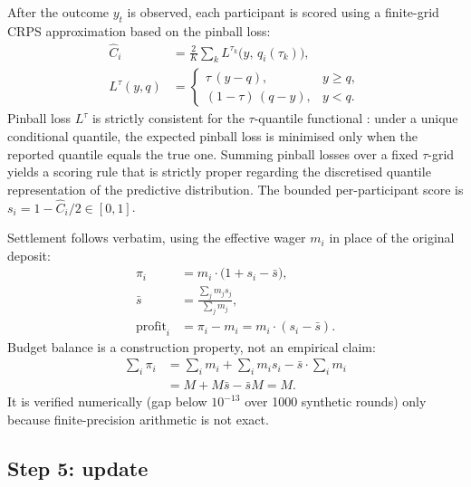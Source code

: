 \documentclass[
  11pt,
  a4paper,
  oneside]{report}
\begin{document}
After the outcome \(y_t\) is observed, each participant is scored using
a finite-grid CRPS approximation based on the pinball loss:
\begin{align}
  \hat{C}_i &= \frac{2}{K} \sum_k L^{\tau_k}\!\big(y,\, q_i(\tau_k)\big), \\
  L^{\tau}(y, q) &=
  \begin{cases}
    \tau\, (y - q), & y \geq q, \\
    (1 - \tau)\, (q - y), & y < q.
  \end{cases}
\end{align} Pinball loss \(L^{\tau}\) is strictly consistent for the
\(\tau\)-quantile functional
\citep{gneiting2007strictly, steinwart2011estimating}: under a unique
conditional quantile, the expected pinball loss is minimised only when
the reported quantile equals the true one. Summing pinball losses over a
fixed \(\tau\)-grid yields a scoring rule that is strictly proper
regarding the discretised quantile representation of the predictive
distribution. The bounded per-participant score is
\(s_i = 1 - \hat{C}_i / 2 \in [0, 1]\).

Settlement follows \citet{lambert2008selffinanced} verbatim, using the
effective wager \(m_i\) in place of the original deposit: \begin{align}
  \pi_i &= m_i \cdot \big(1 + s_i - \bar s\big), \\
  \bar s &= \frac{\sum_j m_j s_j}{\sum_j m_j}, \\
  \mathrm{profit}_i &= \pi_i - m_i = m_i \cdot (s_i - \bar s).
\end{align} Budget balance is a construction property, not an empirical
claim: \begin{align*}
  \sum_i \pi_i
  &= \sum_i m_i + \sum_i m_i s_i - \bar s \cdot \sum_i m_i \\
  &= M + M \bar s - \bar s M = M.
\end{align*} It is verified numerically (gap below \(10^{-13}\) over
1000 synthetic rounds) only because finite-precision arithmetic is not
exact.

\subsection{Step 5: update}\label{step-5-update}
\end{document}
